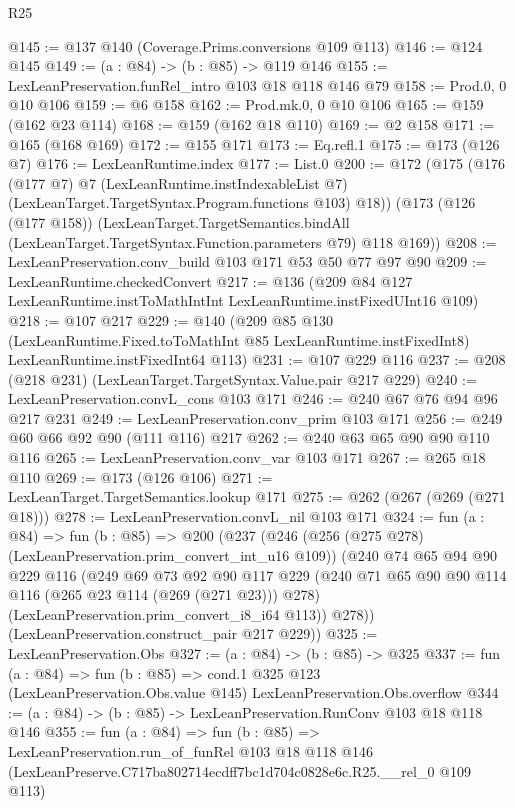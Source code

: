 \begin{lexlean}{R25}
\begin{coremodule}
@145 := @137 @140 (Coverage.Prims.conversions @109 @113)
@146 := @124 @145
@149 := (a : @84) -> (b : @85) -> @119 @146
@155 := LexLeanPreservation.funRel_intro @103 @18 @118 @146 @79
@158 := Prod.{0, 0} @10 @106
@159 := @6 @158
@162 := Prod.mk.{0, 0} @10 @106
@165 := @159 (@162 @23 @114)
@168 := @159 (@162 @18 @110)
@169 := @2 @158
@171 := @165 (@168 @169)
@172 := @155 @171
@173 := Eq.refl.{1}
@175 := @173 (@126 @7)
@176 := LexLeanRuntime.index
@177 := List.{0}
@200 := @172
    (@175
      (@176
        (@177 @7)
        @7
        (LexLeanRuntime.instIndexableList @7)
        (LexLeanTarget.TargetSyntax.Program.functions @103)
        @18))
    (@173
      (@126 (@177 @158))
      (LexLeanTarget.TargetSemantics.bindAll
        (LexLeanTarget.TargetSyntax.Function.parameters @79)
        @118
        @169))
@208 := LexLeanPreservation.conv_build @103 @171 @53 @50 @77 @97 @90
@209 := LexLeanRuntime.checkedConvert
@217 := @136 (@209 @84 @127 LexLeanRuntime.instToMathIntInt LexLeanRuntime.instFixedUInt16 @109)
@218 := @107 @217
@229 := @140
    (@209
      @85
      @130
      (LexLeanRuntime.Fixed.toToMathInt @85 LexLeanRuntime.instFixedInt8)
      LexLeanRuntime.instFixedInt64
      @113)
@231 := @107 @229 @116
@237 := @208 (@218 @231) (LexLeanTarget.TargetSyntax.Value.pair @217 @229)
@240 := LexLeanPreservation.convL_cons @103 @171
@246 := @240 @67 @76 @94 @96 @217 @231
@249 := LexLeanPreservation.conv_prim @103 @171
@256 := @249 @60 @66 @92 @90 (@111 @116) @217
@262 := @240 @63 @65 @90 @90 @110 @116
@265 := LexLeanPreservation.conv_var @103 @171
@267 := @265 @18 @110
@269 := @173 (@126 @106)
@271 := LexLeanTarget.TargetSemantics.lookup @171
@275 := @262 (@267 (@269 (@271 @18)))
@278 := LexLeanPreservation.convL_nil @103 @171
@324 := fun (a : @84) =>
  fun (b : @85) =>
  @200
    (@237
      (@246
        (@256 (@275 @278) (LexLeanPreservation.prim_convert_int_u16 @109))
        (@240
          @74
          @65
          @94
          @90
          @229
          @116
          (@249
            @69
            @73
            @92
            @90
            @117
            @229
            (@240 @71 @65 @90 @90 @114 @116 (@265 @23 @114 (@269 (@271 @23))) @278)
            (LexLeanPreservation.prim_convert_i8_i64 @113))
          @278))
      (LexLeanPreservation.construct_pair @217 @229))
@325 := LexLeanPreservation.Obs
@327 := (a : @84) -> (b : @85) -> @325
@337 := fun (a : @84) =>
  fun (b : @85) =>
  cond.{1} @325 @123 (LexLeanPreservation.Obs.value @145) LexLeanPreservation.Obs.overflow
@344 := (a : @84) -> (b : @85) -> LexLeanPreservation.RunConv @103 @18 @118 @146
@355 := fun (a : @84) =>
  fun (b : @85) =>
  LexLeanPreservation.run_of_funRel
    @103
    @18
    @118
    @146
    (LexLeanPreserve.C717ba802714ecdff7bc1d704c0828e6c.R25.__rel_0 @109 @113)
\end{coremodule}
\end{lexlean}

